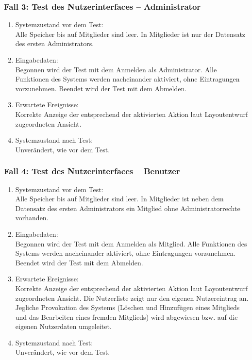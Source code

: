 \subsubsection{Fall 3: Test des Nutzerinterfaces -- Administrator}
\begin{enumerate}
\item Systemzustand vor dem Test:\\
	Alle Speicher bis auf Mitglieder sind leer. In Mitglieder ist nur der Datensatz des ersten Administrators.
\item Eingabedaten:\\
	Begonnen wird der Test mit dem Anmelden als Administrator. Alle Funktionen des Systems werden nacheinander aktiviert, ohne Eintragungen vorzunehmen. Beendet wird der Test mit dem Abmelden.
\item Erwartete Ereignisse:\\
	Korrekte Anzeige der entsprechend der aktivierten Aktion laut Layoutentwurf zugeordneten Ansicht.
\item Systemzustand nach Test:\\
	Unverändert, wie vor dem Test.
\end{enumerate}

\subsubsection{Fall 4: Test des Nutzerinterfaces -- Benutzer}
\begin{enumerate}
\item Systemzustand vor dem Test:\\
	Alle Speicher bis auf Mitglieder sind leer. In Mitglieder ist neben dem Datensatz des ersten Administrators ein Mitglied ohne Administratorrechte vorhanden.
\item Eingabedaten:\\
	Begonnen wird der Test mit dem Anmelden als Mitglied. Alle Funktionen des Systems werden nacheinander aktiviert, ohne Eintragungen vorzunehmen. Beendet wird der Test mit dem Abmelden.
\item Erwartete Ereignisse:\\
	Korrekte Anzeige der entsprechend der aktivierten Aktion laut Layoutentwurf zugeordneten Ansicht. Die Nutzerliste zeigt nur den eigenen Nutzereintrag an. Jegliche Provokation des Systems (Löschen und Hinzufügen eines Mitglieds und das Bearbeiten eines fremden Mitglieds) wird abgewiesen bzw. auf die eigenen Nutzerdaten umgeleitet.
\item Systemzustand nach Test:\\
	Unverändert, wie vor dem Test.
\end{enumerate}

